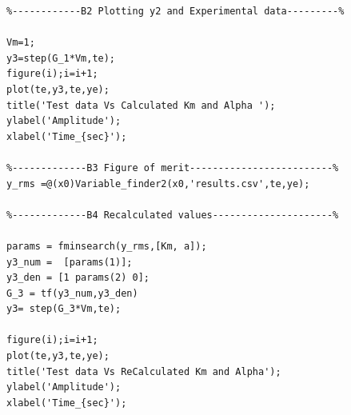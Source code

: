\documentclass[11pt,a4paper]{article}
\begin{document}
\begin{enumerate}
\begin{lstlisting}
%------------B2 Plotting y2 and Experimental data---------%

Vm=1;
y3=step(G_1*Vm,te);
figure(i);i=i+1;
plot(te,y3,te,ye);
title('Test data Vs Calculated Km and Alpha ');
ylabel('Amplitude');
xlabel('Time_{sec}');

%-------------B3 Figure of merit-------------------------%
y_rms =@(x0)Variable_finder2(x0,'results.csv',te,ye);

%-------------B4 Recalculated values---------------------%

params = fminsearch(y_rms,[Km, a]);
y3_num =  [params(1)];
y3_den = [1 params(2) 0];
G_3 = tf(y3_num,y3_den)
y3= step(G_3*Vm,te);
 
figure(i);i=i+1;
plot(te,y3,te,ye);
title('Test data Vs ReCalculated Km and Alpha');
ylabel('Amplitude');
xlabel('Time_{sec}');
\end{lstlisting}
\end{enumerate}










\pagebreak
\end{document}
